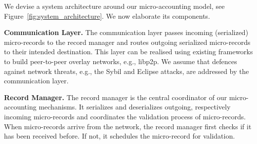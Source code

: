 
We devise a system architecture around our micro-accounting model, see Figure~\ref{fig:system_architecture}.
We now elaborate its components.

\textbf{Communication Layer.}
The communication layer passes incoming (serialized) micro-records to the record manager and routes outgoing serialized micro-records to their intended destination.
This layer can be realised using existing frameworks to build peer-to-peer overlay networks, e.g., libp2p.
We assume that defences against network threats, e.g., the Sybil and Eclipse attacks, are addressed by the communication layer.

\textbf{Record Manager.}
The record manager is the central coordinator of our micro-accounting mechanisms.
It serializes and deserializes outgoing, respectively incoming micro-records and coordinates the validation process of micro-records.
When micro-records arrive from the network, the record manager first checks if it has been received before.
If not, it schedules the micro-record for validation.

